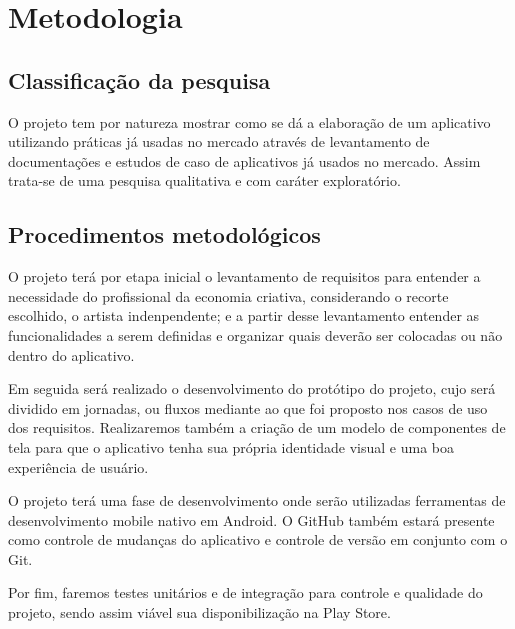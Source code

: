 \chapter{Metodologia}\label{ch:metodologia}

\section{Classificação da pesquisa}\label{sec:classificacao-da-pesquisa}

O projeto tem por natureza mostrar como se dá a elaboração de um aplicativo utilizando práticas já usadas no mercado através de levantamento de documentações e estudos de caso de aplicativos já usados no mercado.
Assim trata-se de uma pesquisa qualitativa e com caráter exploratório.

\section{Procedimentos metodológicos}\label{sec:procedimentos-metodologicos}

O projeto terá por etapa inicial o levantamento de requisitos para entender a necessidade do profissional da economia criativa, considerando o recorte escolhido, o artista indenpendente; e a partir desse levantamento entender as funcionalidades a serem definidas e organizar quais deverão ser colocadas ou não dentro do aplicativo.

Em seguida será realizado o desenvolvimento do protótipo do projeto, cujo será dividido em jornadas, ou fluxos mediante ao que foi proposto nos casos de uso dos requisitos.
Realizaremos também a criação de um modelo de componentes de tela para que o aplicativo tenha sua própria identidade visual e uma boa experiência de usuário.

O projeto terá uma fase de desenvolvimento onde serão utilizadas ferramentas de desenvolvimento mobile nativo em Android.
O GitHub também estará presente como controle de mudanças do aplicativo e controle de versão em conjunto com o Git.

Por fim, faremos testes unitários e de integração para controle e qualidade do projeto, sendo assim viável sua disponibilização na Play Store.
